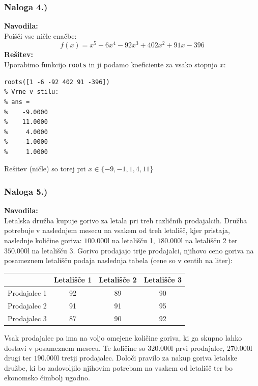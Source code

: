 \documentclass[a4paper,11pt]{article}
\begin{document}
\subsubsection{Naloga 4.)}
\label{task:maj2008_4}

\textbf{Navodila:} \\
Poišči vse ničle enačbe:
\begin{equation} \label{eq:maj2008_4}
f(x) = x^5 -6x^4 - 92x^3 + 402x^2 + 91x - 396
\end{equation}
\textbf{Rešitev:} \\
Uporabimo funkcijo \texttt{roots} in ji podamo koeficiente za vsako stopnjo $x$:
\begin{lstlisting}
roots([1 -6 -92 402 91 -396])
% Vrne v stilu:
% ans =
%    -9.0000
%    11.0000
%     4.0000
%    -1.0000
%     1.0000
\end{lstlisting}
Rešitev (ničle) so torej pri $x \in \{-9, -1, 1, 4, 11\}$


\subsubsection{Naloga 5.)}
\label{task:maj2008_5}

\textbf{Navodila:} \\
Letalska družba kupuje gorivo za letala pri treh različnih prodajalcih. Družba potrebuje v naslednjem mesecu na vsakem od treh letališč, kjer pristaja, naslednje količine goriva: $100.000 \si{\litre}$  na letališču 1, $180.000 \si{\litre}$ na letališču 2 ter $350.000 \si{\litre}$ na letališču 3. Gorivo prodajajo trije prodajalci, njihovo ceno goriva na posameznem letališču podaja naslednja tabela (cene so v centih na liter):
\begin{table}[hbt]
 	\centering
	\begin{tabular}{| l | c | c | c | }
		\hline
 			& Letališče 1 & Letališče 2  & Letališče 3 \\ \hline
		Prodajalec 1 & 92 & 89 & 90 \\ \hline
		Prodajalec 2 & 91 & 91 & 95 \\ \hline
		Prodajalec 3 & 87 & 90 & 92 \\ \hline
	\end{tabular}
\end{table}

Vsak prodajalec pa ima na voljo omejene količine goriva, ki ga skupno lahko dostavi v posameznem mesecu. Te količine so $320.000\si{\litre}$ prvi prodajalec, $270.000\si{\litre}$ drugi ter $190.000\si{\litre}$  tretji prodajalec. Določi pravilo za nakup goriva letalske družbe, ki bo zadovoljilo njihovim potrebam na vsakem od letališč ter bo ekonomsko čimbolj ugodno.
\end{document}
